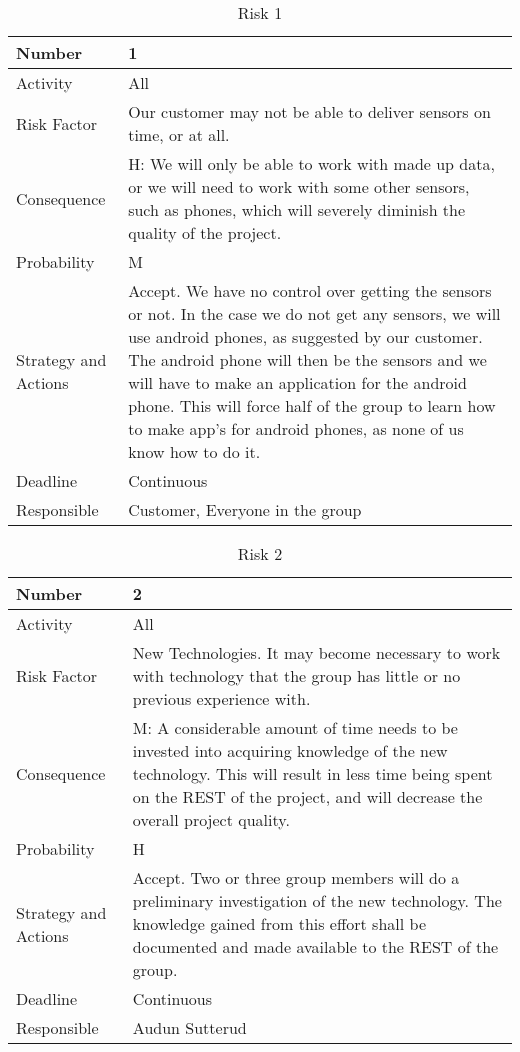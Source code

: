 \documentclass[../document.tex]{subfiles}
\begin{document}
\begin{table}[H]
\caption{Risk 1}
\begin{tabularx}{\textwidth}{|l|X|}
\hline
Number
&1
\\ \hline Activity
&All
\\ \hline Risk Factor
&Our customer may not be able to deliver sensors on time, or at all.
\\ \hline Consequence
&H: We will only be able to work with made up data, or we will need to work with some other sensors, such as phones, which will severely diminish the quality of the project.
\\ \hline Probability
&M
\\ \hline Strategy and Actions
&Accept. We have no control over getting the sensors or not. In the case we do not get any sensors, we will use android phones, as suggested by our customer. The android phone will then be the sensors and we will have to make an application for the android phone. This will force half of the group to learn how to make app’s for android phones, as none of us know how to do it.
\\ \hline Deadline
&Continuous
\\ \hline Responsible
&Customer, Everyone in the group
\\ \hline 
\end{tabularx}
\end{table}

\begin{table}[H]
\caption{Risk 2}
\begin{tabularx}{\textwidth}{|l|X|}
\hline
Number
&2
\\ \hline Activity
&All
\\ \hline Risk Factor
&New Technologies. It may become necessary to work with technology that the group has little or no previous experience with.
\\ \hline Consequence
&M: A considerable amount of time needs to be invested into acquiring knowledge of the new technology. This will result in less time being spent on the \gls{REST} of the project, and will decrease the overall project quality.
\\ \hline Probability
&H
\\ \hline Strategy and Actions
&Accept. Two or three group members will do a preliminary investigation of the new technology. The knowledge gained from this effort shall be documented and made available to the \gls{REST} of the group.
\\ \hline Deadline
&Continuous
\\ \hline Responsible
&Audun Sutterud
\\ \hline 
\end{tabularx}
\end{table}
\end{document}
